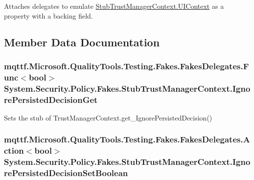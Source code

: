 Attaches delegates to emulate \hyperlink{class_system_1_1_security_1_1_policy_1_1_fakes_1_1_stub_trust_manager_context_a27fe169ba01ad0c4d2f5cb620e6fcdb6}{Stub\-Trust\-Manager\-Context.\-U\-I\-Context} as a property with a backing field.



\subsection{Member Data Documentation}
\hypertarget{class_system_1_1_security_1_1_policy_1_1_fakes_1_1_stub_trust_manager_context_a687326499801b4fa2a77955a3db80e31}{
\subsubsection[{Ignore\-Persisted\-Decision\-Get}]{\setlength{\rightskip}{0pt plus 5cm}mqttf.\-Microsoft.\-Quality\-Tools.\-Testing.\-Fakes.\-Fakes\-Delegates.\-Func$<$bool$>$ System.\-Security.\-Policy.\-Fakes.\-Stub\-Trust\-Manager\-Context.\-Ignore\-Persisted\-Decision\-Get}}\label{class_system_1_1_security_1_1_policy_1_1_fakes_1_1_stub_trust_manager_context_a687326499801b4fa2a77955a3db80e31}


Sets the stub of Trust\-Manager\-Context.\-get\-\_\-\-Ignore\-Persisted\-Decision()

\hypertarget{class_system_1_1_security_1_1_policy_1_1_fakes_1_1_stub_trust_manager_context_a6d6b9ab43c09f3cfe1afd969bb0b8696}{
\subsubsection[{Ignore\-Persisted\-Decision\-Set\-Boolean}]{\setlength{\rightskip}{0pt plus 5cm}mqttf.\-Microsoft.\-Quality\-Tools.\-Testing.\-Fakes.\-Fakes\-Delegates.\-Action$<$bool$>$ System.\-Security.\-Policy.\-Fakes.\-Stub\-Trust\-Manager\-Context.\-Ignore\-Persisted\-Decision\-Set\-Boolean}}\label{class_system_1_1_security_1_1_policy_1_1_fakes_1_1_stub_trust_manager_context_a6d6b9ab43c09f3cfe1afd969bb0b8696}


